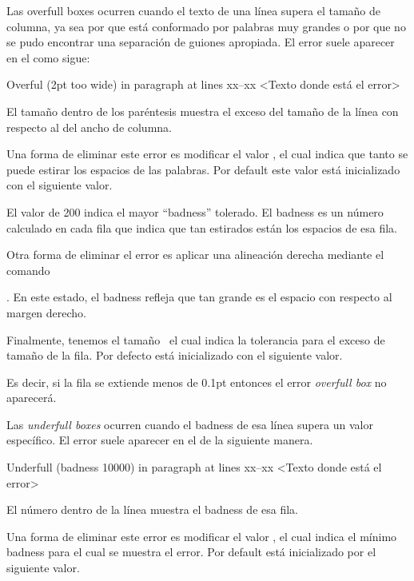 Las overfull boxes ocurren cuando el texto de una línea supera el tamaño de columna, ya sea por que está conformado por palabras muy grandes o por que no se pudo encontrar una separación de guiones apropiada. El error suele aparecer en el  como sigue:
\begin{codeblock}
  Overful \hbox (2pt too wide) in paragraph at lines xx--xx
  <Texto donde está el error>
\end{codeblock}

El tamaño dentro de los paréntesis muestra el exceso del tamaño de la línea con respecto al del ancho de columna.

Una forma de eliminar este error es modificar el valor \texcs\tolerance, el cual indica que tanto se puede estirar los espacios de las palabras. Por default este valor está inicializado con el siguiente valor.
\begin{texcode}
\end{texcode}
El valor de 200 indica el mayor ``badness'' tolerado. El badness es un número calculado en cada fila que indica que tan estirados están los espacios de esa fila.

Otra forma de eliminar el error es aplicar una alineación derecha mediante el comando \texcs\raggedright. En este estado, el badness refleja que tan grande es el espacio con respecto al margen derecho.

Finalmente, tenemos el tamaño \texcs\hfuzz\ el cual indica la tolerancia para el exceso de tamaño de la fila. Por defecto está inicializado con el siguiente valor.
\begin{texcode}
  \hfuzz=0.1pt
\end{texcode}

Es decir, si la fila se extiende menos de 0.1pt entonces el error \emph{overfull box} no aparecerá.

Las \emph{underfull boxes} ocurren cuando el badness de esa línea supera un valor específico. El error suele aparecer en el  de la siguiente manera.
\begin{texcode}
  Underfull \hbox (badness 10000) in paragraph at lines xx--xx
  <Texto donde está el error>
\end{texcode}
El número dentro de la línea muestra el badness de esa fila.

Una forma de eliminar este error es modificar el valor \texcs\hbadness, el cual indica el mínimo badness para el cual se muestra el error. Por default está inicializado por el siguiente valor.
\begin{texcode}
\end{texcode}

